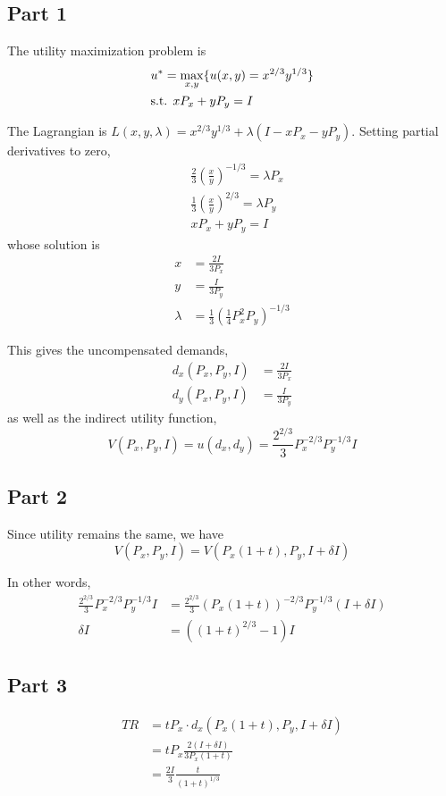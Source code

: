 \documentclass{article}
\begin{document}
\subsection{Part 1}
The utility maximization problem is
\begin{align*}
	&u^*=\max_{x,y}\{u(x,y)=x^{2/3}y^{1/3}\}\\
	&\textup{s.t. }xP_x+yP_y=I
\end{align*}

The Lagrangian is $L(x,y,\lambda)=x^{2/3}y^{1/3}+\lambda(I-xP_x-yP_y)$. Setting partial derivatives to zero,
\begin{align*}
	&\frac{2}{3}\left(\frac{x}{y}\right)^{-1/3}=\lambda P_x\\
	&\frac{1}{3}\left(\frac{x}{y}\right)^{2/3}=\lambda P_y\\
	&xP_x+yP_y=I
\end{align*}
whose solution is
\begin{align*}
	x&=\frac{2I}{3P_x}\\
	y&=\frac{I}{3P_y}\\
	\lambda&=\frac{1}{3}\left(\frac{1}{4}P_x^2P_y\right)^{-1/3}
\end{align*}

This gives the uncompensated demands,
\begin{align*}
	d_x(P_x,P_y,I)&=\frac{2I}{3P_x}\\
	d_y(P_x,P_y,I)&=\frac{I}{3P_y}
\end{align*}
as well as the indirect utility function,
\begin{equation*}
	V(P_x,P_y,I)=u(d_x,d_y)=\frac{2^{2/3}}{3}P_x^{-2/3}P_y^{-1/3}I
\end{equation*}

\subsection{Part 2}
Since utility remains the same, we have
\begin{equation*}
	V(P_x,P_y,I)=V(P_x(1+t),P_y,I+\delta I)
\end{equation*}

In other words,
\begin{align*}
	\frac{2^{2/3}}{3}P_x^{-2/3}P_y^{-1/3}I&=\frac{2^{2/3}}{3}(P_x(1+t))^{-2/3}P_y^{-1/3}(I+\delta I)\\
	\delta I&=\left((1+t)^{2/3}-1\right)I
\end{align*}

\subsection{Part 3}
\begin{align*}
	TR&=tP_x\cdot d_x(P_x(1+t),P_y,I+\delta I)\\
	&=tP_x\frac{2(I+\delta I)}{3P_x(1+t)}\\
	&=\frac{2I}{3}\frac{t}{(1+t)^{1/3}}
\end{align*}
\end{document}

